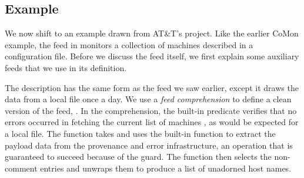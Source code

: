 




\subsection{\vizGems{} Example}
We now shift to an example drawn from AT\&T's \vizGems{} project.  Like
the earlier CoMon example, the  feed in 
monitors a collection of machines described in a configuration file.
Before we discuss the  feed itself, we first explain some
auxiliary feeds that we use in its definition.   

The  description has the same form as the 
feed we saw earlier, except it draws the data from a local file once a
day.  We use a \textit{feed comprehension} to define a clean
version of the feed, .  In the comprehension, the
built-in predicate  verifies that no errors occurred in
fetching the current list of machines , as would be expected
for a local file.  The function  takes  and uses
the built-in function  to extract the payload data from
the provenance and error infrastructure, an operation that is
guaranteed to succeed because of the  guard. The function
 then selects the non-comment entries and unwraps them to
produce a list of unadorned host names.   

